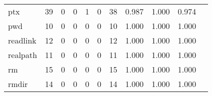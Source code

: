 \begin{longtable}{lp{1.20cm}p{1.20cm}p{1.20cm}p{1.20cm}p{1.20cm}p{1.20cm}p{1.20cm}p{1.20cm}p{1.20cm}p{1.20cm}}
ptx       &                                    39 &                                                  0 &                                                  0 &                                                  1 &                                                  0 &                                                 38 &                                         0.987 &                                              1.000 &                                              0.974 \\
pwd       &                                    10 &                                                  0 &                                                  0 &                                                  0 &                                                  0 &                                                 10 &                                         1.000 &                                              1.000 &                                              1.000 \\
readlink  &                                    12 &                                                  0 &                                                  0 &                                                  0 &                                                  0 &                                                 12 &                                         1.000 &                                              1.000 &                                              1.000 \\
realpath  &                                    11 &                                                  0 &                                                  0 &                                                  0 &                                                  0 &                                                 11 &                                         1.000 &                                              1.000 &                                              1.000 \\
rm        &                                    15 &                                                  0 &                                                  0 &                                                  0 &                                                  0 &                                                 15 &                                         1.000 &                                              1.000 &                                              1.000 \\
rmdir     &                                    14 &                                                  0 &                                                  0 &                                                  0 &                                                  0 &                                                 14 &                                         1.000 &                                              1.000 &                                              1.000 \\

\end{longtable}
